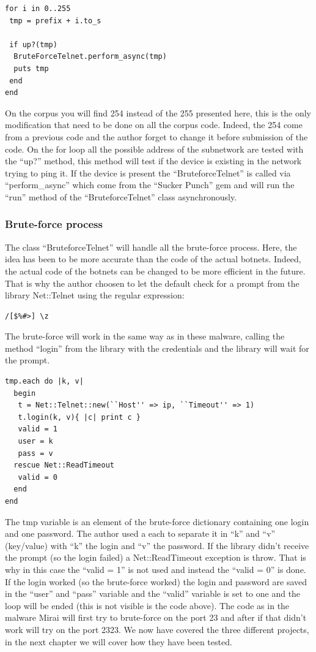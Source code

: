 \documentclass{report}
\begin{document}
\lstset{language=Ruby}
\begin{lstlisting}[frame=single]
for i in 0..255
 tmp = prefix + i.to_s

 if up?(tmp)
  BruteForceTelnet.perform_async(tmp)
  puts tmp
 end
end
\end{lstlisting}
On the corpus you will find 254 instead of the 255 presented here, this is the only modification that need to be done on all the corpus code. Indeed, the 254 come from a previous code and the author forget to change it before submission of the code.\newline
On the for loop all the possible address of the subnetwork are tested with the ``up?'' method, this method will test if the device is existing in the network trying to ping it. If the device is present the ``BruteforceTelnet'' is called via ``perform\_async'' which come from the ``Sucker Punch'' \autocite{suckerpunch} gem and will run the ``run'' method of the ``BruteforceTelnet'' class asynchronously.

\subsubsection{Brute-force process}
The class ``BruteforceTelnet'' will handle all the brute-force process. Here, the idea has been to be more accurate than the code of the actual botnets. Indeed, the actual code of the botnets can be changed to be more efficient in the future. That is why the author choosen to let the default check for a prompt from the library Net::Telnet \autocite{nettelnet} using the regular expression:
\begin{Verbatim}[frame=single]
/[$%#>] \z
\end{Verbatim}
The brute-force will work in the same way as in these malware, calling the method ``login'' from the library with the credentials and the library will wait for the prompt.
\lstset{language=Ruby}
\begin{lstlisting}[frame=single]
tmp.each do |k, v|
  begin
   t = Net::Telnet::new(``Host'' => ip, ``Timeout'' => 1)
   t.login(k, v){ |c| print c }
   valid = 1
   user = k
   pass = v
  rescue Net::ReadTimeout
   valid = 0
  end
end
\end{lstlisting}
The tmp variable is an element of the brute-force dictionary containing one login and one password. The author used a each to separate it in ``k'' and ``v'' (key/value) with ``k'' the login and ``v'' the password. If the library didn't receive the prompt (so the login failed) a Net::ReadTimeout exception is throw. That is why in this case the ``valid = 1'' is not used and instead the ``valid = 0'' is done. If the login worked (so the brute-force worked) the login and password are saved in the ``user'' and ``pass'' variable and the ``valid'' variable is set to one and the loop will be ended (this is not visible is the code above).\newline
The code as in the malware Mirai will first try to brute-force on the port 23 and after if that didn't work will try on the port 2323.\newline
\newline
We now have covered the three different projects, in the next chapter we will cover how they have been tested.
\end{document}
